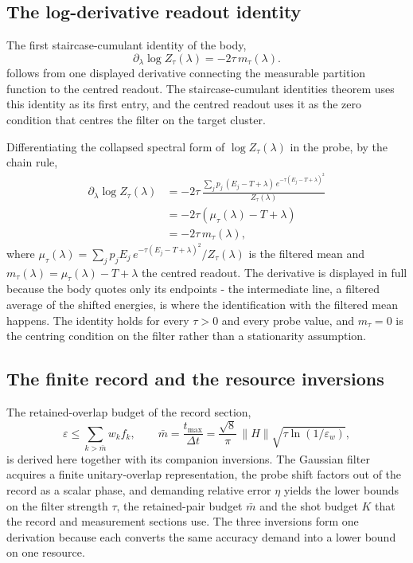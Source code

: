\subsection*{The log-derivative readout identity}

The first staircase-cumulant identity of the body,
\begin{equation*}
\partial_\lambda \log Z_\tau(\lambda) = -2\tau \, m_\tau(\lambda) .
\end{equation*}
follows from one displayed derivative connecting the measurable partition function to the centred readout. The staircase-cumulant identities theorem uses this identity as its first entry, and the centred readout uses it as the zero condition that centres the filter on the target cluster.

Differentiating the collapsed spectral form of $\log Z_\tau(\lambda)$ in the probe, by the chain rule,
\begin{align*}
\partial_\lambda \log Z_\tau(\lambda)
&= -2\tau \, \frac{\sum_j p_j \, (E_j - T + \lambda) \, e^{-\tau (E_j - T + \lambda)^2}}{Z_\tau(\lambda)} \\
&= -2\tau \left( \mu_\tau(\lambda) - T + \lambda \right) \\
&= -2\tau \, m_\tau(\lambda) ,
\end{align*}
where $\mu_\tau(\lambda) = \sum_j p_j E_j \, e^{-\tau (E_j - T + \lambda)^2} / Z_\tau(\lambda)$ is the filtered mean and $m_\tau(\lambda) = \mu_\tau(\lambda) - T + \lambda$ the centred readout. The derivative is displayed in full because the body quotes only its endpoints - the intermediate line, a filtered average of the shifted energies, is where the identification with the filtered mean happens. The identity holds for every $\tau > 0$ and every probe value, and $m_\tau = 0$ is the centring condition on the filter rather than a stationarity assumption.

\subsection*{The finite record and the resource inversions}

The retained-overlap budget of the record section,
\begin{equation*}
\varepsilon \le \sum_{k > \bar m} w_k f_k , \qquad
\bar m = \frac{t_{\max}}{\Delta t} = \frac{\sqrt{8}}{\pi} \, \|H\| \sqrt{\tau \ln(1/\varepsilon_w)} ,
\end{equation*}
is derived here together with its companion inversions. The Gaussian filter acquires a finite unitary-overlap representation, the probe shift factors out of the record as a scalar phase, and demanding relative error $\eta$ yields the lower bounds on the filter strength $\tau$, the retained-pair budget $\bar m$ and the shot budget $K$ that the record and measurement sections use. The three inversions form one derivation because each converts the same accuracy demand into a lower bound on one resource.

